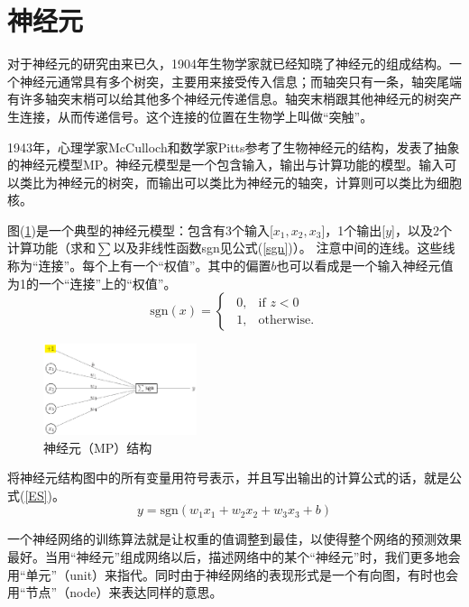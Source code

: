 \documentclass[UTF-8]{progbookcn}
\begin{document}
\section{神经元}
对于神经元的研究由来已久，1904年生物学家就已经知晓了神经元的组成结构。一个神经元通常具有多个树突，主要用来接受传入信息；而轴突只有一条，轴突尾端有许多轴突末梢可以给其他多个神经元传递信息。轴突末梢跟其他神经元的树突产生连接，从而传递信号。这个连接的位置在生物学上叫做“突触”\cite{Ram}。

1943年，心理学家McCulloch和数学家Pitts参考了生物神经元的结构，发表了抽象的神经元模型MP。神经元模型是一个包含输入，输出与计算功能的模型。输入可以类比为神经元的树突，而输出可以类比为神经元的轴突，计算则可以类比为细胞核\cite{DBLP:books/ox/90/McCullochP90}。




图(\ref{NU})是一个典型的神经元模型：包含有3个输入[$x_1,x_2,x_3$]，1个输出[$y$]，以及2个计算功能（求和$\sum$以及非线性函数sgn见公式(\ref{sgn})）。 注意中间的连线。这些线称为“连接”。每个上有一个“权值”。其中的偏置$b$也可以看成是一个输入神经元值为1的一个“连接”上的“权值”。
 \begin{equation}\label{sgn}
    \text{sgn}(x) = \begin{cases}
                   ~~0, & \mbox{if } z<0 \\
                   ~~1, & \mbox{otherwise}.
                 \end{cases}
 \end{equation}

 \begin{figure}[!h]
  \centering
  \includegraphics[width=0.4\textwidth]{tu1.eps}
  \caption{神经元（MP）结构}\label{NU}
\end{figure}

将神经元结构图中的所有变量用符号表示，并且写出输出的计算公式的话，就是公式(\ref{ES})。
 \begin{equation}\label{ES}
    y = \text{sgn}(w_1x_1+w_2x_2+w_3x_3+b)
 \end{equation}




一个神经网络的训练算法就是让权重的值调整到最佳，以使得整个网络的预测效果最好。当用“神经元”组成网络以后，描述网络中的某个“神经元”时，我们更多地会用“单元”（unit）来指代。同时由于神经网络的表现形式是一个有向图，有时也会用“节点”（node）来表达同样的意思。
\end{document}

